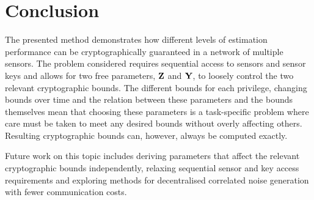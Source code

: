 \documentclass[letterpaper, 10 pt, conference]{ieeeconf}
\begin{document}
\section{Conclusion}\label{sec:conc}
The presented method demonstrates how different levels of estimation performance can be cryptographically guaranteed in a network of multiple sensors. The problem considered requires sequential access to sensors and sensor keys and allows for two free parameters, ${{\mathbf{Z}}}$ and ${{\mathbf{Y}}}$, to loosely control the two relevant cryptographic bounds. The different bounds for each privilege, changing bounds over time and the relation between these parameters and the bounds themselves mean that choosing these parameters is a task-specific problem where care must be taken to meet any desired bounds without overly affecting others. Resulting cryptographic bounds can, however, always be computed exactly.

Future work on this topic includes deriving parameters that affect the relevant cryptographic bounds independently, relaxing sequential sensor and key access requirements and exploring methods for decentralised correlated noise generation with fewer communication costs.

\addtolength{\textheight}{-11.05cm}











% 
%                                            
%                                            
%                                            
% 



\end{document}
